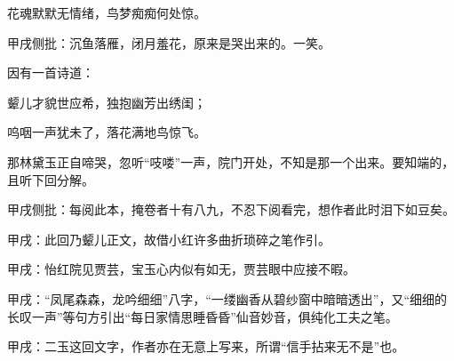 \begin{poem}

    \begin{pl}花魂默默无情绪，鸟梦痴痴何处惊。\end{pl}\begin{note}甲戌侧批：沉鱼落雁，闭月羞花，原来是哭出来的。一笑。\end{note}
\end{poem}
\begin{parag}

    因有一首诗道：
\end{parag}
\begin{poem}
    \begin{pl}颦儿才貌世应希，独抱幽芳出绣闺；\end{pl}
    \begin{pl}呜咽一声犹未了，落花满地鸟惊飞。\end{pl}
\end{poem}
\begin{parag}

    那林黛玉正自啼哭，忽听“吱喽”一声，院门开处，不知是那一个出来。要知端的，且听下回分解。\begin{note}甲戌侧批：每阅此本，掩卷者十有八九，不忍下阅看完，想作者此时泪下如豆矣。\end{note}
\end{parag}


\begin{parag}


    \begin{note}甲戌：此回乃颦儿正文，故借小红许多曲折琐碎之笔作引。\end{note}
\end{parag}


\begin{parag}


    \begin{note}甲戌：怡红院见贾芸，宝玉心内似有如无，贾芸眼中应接不暇。\end{note}
\end{parag}


\begin{parag}


    \begin{note}甲戌：“凤尾森森，龙吟细细”八字，“一缕幽香从碧纱窗中暗暗透出”，又“细细的长叹一声”等句方引出“每日家情思睡昏昏”仙音妙音，俱纯化工夫之笔。\end{note}
\end{parag}


\begin{parag}


    \begin{note}甲戌：二玉这回文字，作者亦在无意上写来，所谓“信手拈来无不是”也。\end{note}
\end{parag}


